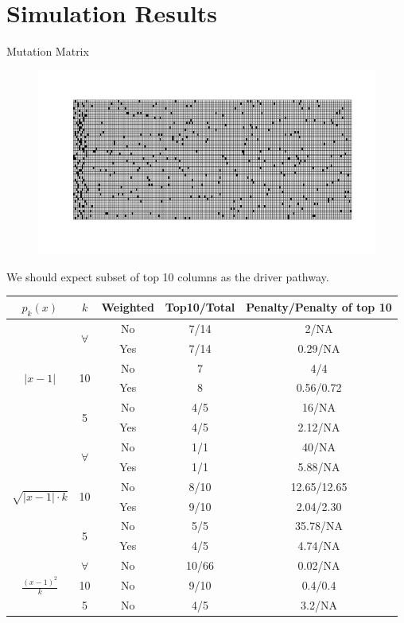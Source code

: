 \documentclass[xcolor=dvipsnames]{beamer}
\begin{document}
\section{Simulation Results}
\begin{frame}{Mutation Matrix}
\begin{figure}
\centering
\includegraphics[width=0.8\linewidth]{simulationpic.png}
\end{figure}
We should expect subset of top 10 columns as the driver pathway.\\
\end{frame}
\begin{frame}
\begin{table}
\centering
\begin{tabular}{|c|c|c|c|c|}
\hline
$p_k(x)$&$k$&Weighted&Top10/Total&Penalty/Penalty of top 10\\
\hline
\multirow{6}{*}{$|x-1|$}&\multirow{2}{*}{$\forall$}&No&7/14&2/NA\\
&&Yes&7/14&0.29/NA\\
&\multirow{2}{*}{10}&No&7&4/4\\
&&Yes&8&0.56/0.72\\
&\multirow{2}{*}{5}&No&4/5&16/NA\\
&&Yes&4/5&2.12/NA\\
\hline
\multirow{6}{*}{$\sqrt{|x-1|\cdot k}$}&\multirow{2}{*}{$\forall$}&No&1/1&40/NA\\
&&Yes&1/1&5.88/NA\\
&\multirow{2}{*}{10}&No&8/10&12.65/12.65\\
&&Yes&9/10&2.04/2.30\\
&\multirow{2}{*}{5}&No&5/5&35.78/NA\\
&&Yes&4/5&4.74/NA\\
\hline
\multirow{3}{*}{$\frac{(x-1)^2}{k}$}&$\forall$&No&10/66&0.02/NA\\
&10&No&9/10&0.4/0.4\\
&5&No&4/5&3.2/NA\\
\hline
\end{tabular}
\end{table}
\end{frame}
\end{document}
